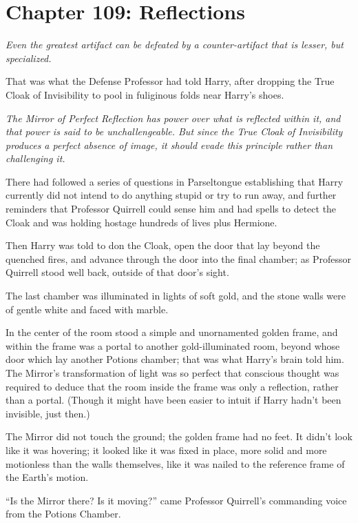 \chapter{Chapter 109: Reflections}
\emph{Even the greatest artifact can be defeated by a counter-artifact that is lesser, but specialized.}

That was what the Defense Professor had told Harry, after dropping the True Cloak of Invisibility to pool in fuliginous folds near Harry's shoes.

\emph{The Mirror of Perfect Reflection has power over what is reflected within it, and that power is said to be unchallengeable. But since the True Cloak of Invisibility produces a perfect absence of image, it should evade this principle rather than challenging it.}

There had followed a series of questions in Parseltongue establishing that Harry currently did not intend to do anything stupid or try to run away, and further reminders that Professor Quirrell could sense him and had spells to detect the Cloak and was holding hostage hundreds of lives plus Hermione.

Then Harry was told to don the Cloak, open the door that lay beyond the quenched fires, and advance through the door into the final chamber; as Professor Quirrell stood well back, outside of that door's sight.

The last chamber was illuminated in lights of soft gold, and the stone walls were of gentle white and faced with marble.

In the center of the room stood a simple and unornamented golden frame, and within the frame was a portal to another gold-illuminated room, beyond whose door which lay another Potions chamber; that was what Harry's brain told him. The Mirror's transformation of light was so perfect that conscious thought was required to deduce that the room inside the frame was only a reflection, rather than a portal. (Though it might have been easier to intuit if Harry hadn't been invisible, just then.)

The Mirror did not touch the ground; the golden frame had no feet. It didn't look like it was hovering; it looked like it was fixed in place, more solid and more motionless than the walls themselves, like it was nailed to the reference frame of the Earth's motion.

``Is the Mirror there? Is it moving?'' came Professor Quirrell's commanding voice from the Potions Chamber.

